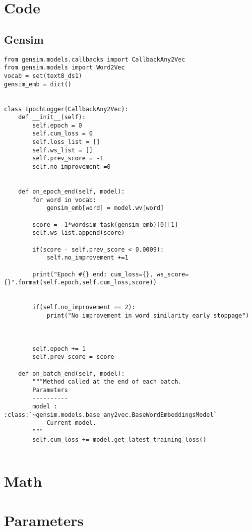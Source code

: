 \chapter{Code}
\section{Gensim}
\begin{lstlisting}
from gensim.models.callbacks import CallbackAny2Vec
from gensim.models import Word2Vec
vocab = set(text8_ds1)
gensim_emb = dict()

    
class EpochLogger(CallbackAny2Vec):
    def __init__(self):
        self.epoch = 0
        self.cum_loss = 0
        self.loss_list = []
        self.ws_list = []
        self.prev_score = -1
        self.no_improvement =0


    def on_epoch_end(self, model):
        for word in vocab:
            gensim_emb[word] = model.wv[word]
            
        score = -1*wordsim_task(gensim_emb)[0][1]
        self.ws_list.append(score)
        
        if(score - self.prev_score < 0.0009):
            self.no_improvement +=1
            
        print("Epoch #{} end: cum_loss={}, ws_score={}".format(self.epoch,self.cum_loss,score))
        
        
        if(self.no_improvement == 2):
            print("No improvement in word similarity early stoppage")
            
            
            
        self.epoch += 1
        self.prev_score = score
    
    def on_batch_end(self, model):
        """Method called at the end of each batch.
        Parameters
        ----------
        model : :class:`~gensim.models.base_any2vec.BaseWordEmbeddingsModel`
            Current model.
        """
        self.cum_loss += model.get_latest_training_loss()
        
\end{lstlisting}

\chapter{Math}

\chapter{Parameters}

